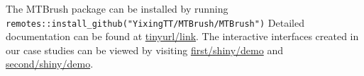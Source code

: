 The MTBrush package can be installed by running
\texttt{remotes::install\_github("YixingTT/MTBrush/MTBrush")} Detailed
documentation can be found at \url{tinyurl/link}. The interactive
interfaces created in our case studies can be viewed by visiting
\url{first/shiny/demo} and \url{second/shiny/demo}.



\address{%
Yixing Tu\\
University of Wisconsin-Madison\\%
1300 University Ave\\ Madison, WI\\ 53706\\
%
%
\textit{ORCiD: \href{https://orcid.org/0000-0002-9079-593X}{0000-0002-9079-593X}}\\%
\href{mailto:ytu26@wisc.edu}{\nolinkurl{ytu26@wisc.edu}}%
}

\address{%
Marc Chevrette\\
\\%
\\
%
%
%
%
}

\address{%
Chris Thomas\\
\\%
\\
%
%
%
%
}

\address{%
Jo Handelsman\\
\\%
\\
%
%
%
%
}

\address{%
Kris Sankaran\\
University of Wisconsin-Madison\\%
1300 University Ave\\ Madison, WI\\ 53706\\
%
\url{https://krisrs1128.github.io/LSLab}\\%
\textit{ORCiD: \href{https://orcid.org/0000-0002-9079-593X}{0000-0002-9079-593X}}\\%
\href{mailto:ksankaran@wisc.edu}{\nolinkurl{ksankaran@wisc.edu}}%
}
